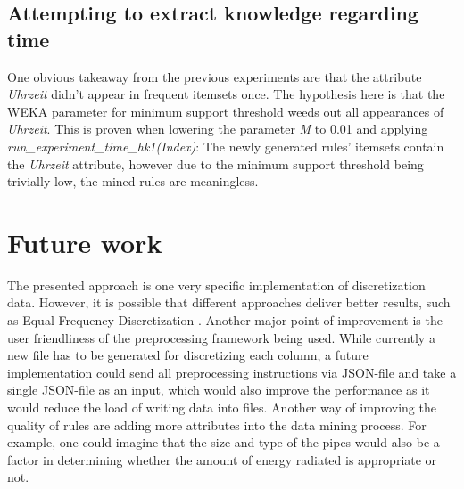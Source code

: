 \documentclass[bachelor,english]{info1thesis}
\begin{document}
\section{Attempting to extract knowledge regarding time}
\label{sec:extractingtime}

One obvious takeaway from the previous experiments are that the attribute \textit{Uhrzeit} didn't appear in frequent itemsets once. The hypothesis here is that the WEKA parameter for minimum support threshold  weeds out all appearances of \textit{Uhrzeit}. This is proven when lowering the parameter \textit{M} to 0.01 and applying \textit{run\_experiment\_time\_hk1(Index)}: The newly generated rules' itemsets contain the \textit{Uhrzeit} attribute, however due to the minimum support threshold being trivially low, the mined rules are meaningless.




\chapter{Future work}
\label{sec:futurework}
The presented approach is one very specific implementation of discretization data. However, it is possible that different approaches deliver better results, such as Equal-Frequency-Discretization \cite{jiang2009approximate}. Another major point of improvement is the user friendliness of the preprocessing framework being used. While currently a new file has to be generated for discretizing each column, a future implementation could send all preprocessing instructions via JSON-file and take a single JSON-file as an input, which would also improve the performance as it would reduce the load of writing data into files. Another way of improving the quality of rules are adding more attributes into the data mining process. For example, one could imagine that the size and type of the pipes would also be a factor in determining whether the amount of energy radiated is appropriate or not.
\end{document}
